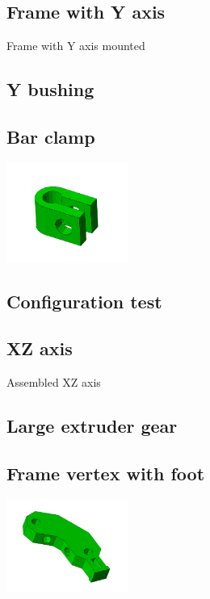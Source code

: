 \documentclass[11pt]{article}
\begin{document}
\hypertarget{thing_frame-with-y}{\subsection{Frame with Y axis}}
Frame with Y axis mounted

\hypertarget{thing_y-bushing}{\subsection{Y bushing}}

\hypertarget{thing_bar-clamp}{\subsection{Bar clamp}}
\includegraphics[width=4cm]{images/bar-clamp.jpg}

\hypertarget{thing_calibration}{\subsection{Configuration test}}

\hypertarget{thing_xz-axis}{\subsection{XZ axis}}
Assembled XZ axis

\hypertarget{thing_large-gear}{\subsection{Large extruder gear}}

\hypertarget{thing_frame-vertex-foot}{\subsection{Frame vertex with foot}}
\includegraphics[width=4cm]{images/frame-vertex-foot.jpg}
\end{document}
